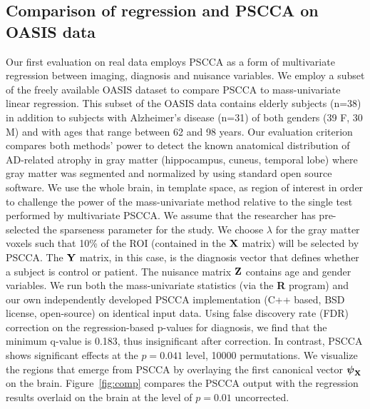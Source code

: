 \documentclass{llncs}
\newcommand{\X}{{\bf X}}
\newcommand{\Y}{{\bf Y}}
\newcommand{\Z}{{\bf Z}}
\newcommand{\bs}{\boldsymbol}
\begin{document}
\subsection{Comparison of regression and PSCCA on OASIS data}
Our first evaluation on real data employs PSCCA as a form of
multivariate regression between imaging, diagnosis and nuisance variables.  
We employ a subset of the freely available OASIS dataset to compare
PSCCA to mass-univariate linear regression.  This subset of the OASIS
data contains elderly subjects (n=38) in addition to subjects with
Alzheimer's disease (n=31) of both genders (39 F, 30 M) and with ages
that range between 62 and 98 years.  Our evaluation criterion compares
both methods' power to detect the known anatomical distribution of
AD-related atrophy in gray matter (hippocampus, cuneus, temporal lobe)
\cite{Avants2010b} where gray matter was segmented and normalized by using standard
open source software.  We use the whole brain, in template space, as region of interest in order to
challenge the power of the mass-univariate method relative to the
single test performed by multivariate PSCCA.  We assume that the
researcher has pre-selected the sparseness parameter for the study.
We choose $\lambda$ for the gray matter voxels such that 10\% of the
ROI (contained in the $\X$ matrix) will be selected by PSCCA.  The
$\Y$ matrix, in this case, is the diagnosis vector that defines
whether a subject is control or patient.  The nuisance matrix $\Z$
contains age and gender variables.  We run both the mass-univariate
statistics (via the {\bf R} program) and our own independently
developed PSCCA implementation (C++ based, BSD license, open-source)
on identical input data.  Using false discovery rate (FDR) correction
on the regression-based p-values for diagnosis, we find that the
minimum q-value is 0.183, thus insignificant after correction.  In
contrast, PSCCA shows significant effects at the $p=0.041$ level,
10000 permutations.  We visualize the regions that emerge from PSCCA
by overlaying the first canonical vector $\bs \psi_{\X}$ on the brain.
Figure~\ref{fig:comp} compares the PSCCA output with the regression
results overlaid on the brain at the level of $p=0.01$ uncorrected.
\end{document}
